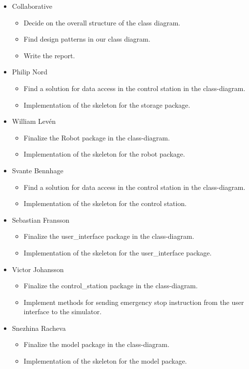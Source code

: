 \begin{itemize}
    \item Collaborative 
      \begin{itemize}
          \item Decide on the overall structure of the class diagram.
          \item Find design patterns in our class diagram.
          \item Write the report.
      \end{itemize}
    \item Philip Nord 
       \begin{itemize}
           \item Find a solution for data access in the control station in the class-diagram.
           \item Implementation of the skeleton for the storage package.
       \end{itemize}
    \item William Lev\'{e}n
       \begin{itemize}
           \item Finalize the Robot package in the class-diagram.
           \item Implementation of the skeleton for the robot package.
       \end{itemize}
    \item Svante Bennhage
       \begin{itemize}
           \item Find a solution for data access in the control station in the class-diagram.
           \item Implementation of the skeleton for the control station.
       \end{itemize}
    \item Sebastian Fransson
       \begin{itemize}
           \item Finalize the user\_interface package in the class-diagram.
           \item Implementation of the skeleton for the user\_interface package.
       \end{itemize}
    \item Victor Johansson
       \begin{itemize}
           \item Finalize the control\_station package in the class-diagram.
           \item Implement methods for sending emergency stop instruction from the user interface to the simulator.
       \end{itemize}
    \item Snezhina Racheva
       \begin{itemize}
           \item Finalize the model package in the class-diagram.
           \item Implementation of the skeleton for the model package.
       \end{itemize}
\end{itemize}